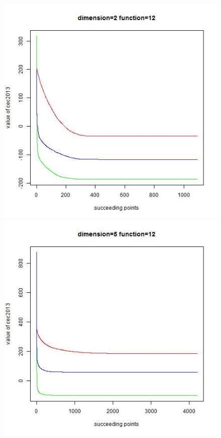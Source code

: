 \documentclass{article}
\begin{document}
\begin{figure}[!htb]
\centering
{}
  \includegraphics[width=\linewidth]{dim_2__func_12}
\endminipage\hfill
{}
  \includegraphics[width=\linewidth]{dim_5__func_12}

\end{figure}
\end{document}
